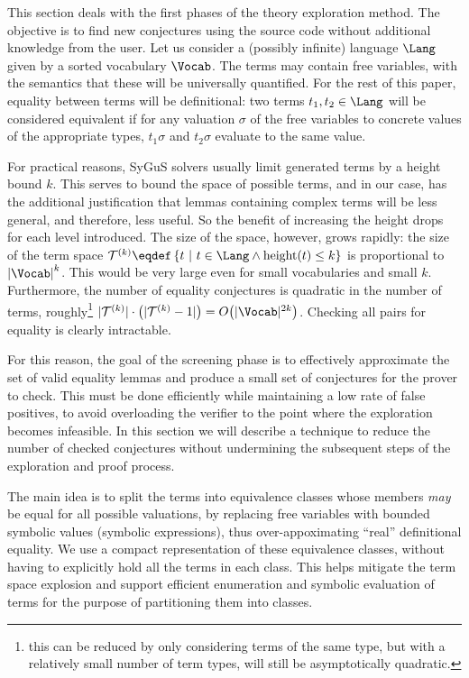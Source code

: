 This section deals with the first phases of the theory exploration method.
The objective is to find new conjectures using the source code without additional knowledge from the user.
Let us consider a (possibly infinite) language $\Lang$ given by a sorted vocabulary $\Vocab$.
The terms may contain free variables, with the semantics that these will be universally quantified.
For the rest of this paper, equality between terms will be definitional: two terms
$t_1, t_2 \in \Lang$ will be considered equivalent if for any valuation $\sigma$ of the 
free variables to concrete values of the appropriate types, $t_1\sigma$ and $t_2\sigma$
evaluate to the same value.

For practical reasons, SyGuS solvers usually limit generated terms by a height bound $k$.
This serves to bound the space of possible terms, and in our case, has the additional
justification that lemmas containing complex terms will be less general, and therefore,
less useful.
So the benefit of increasing the height drops for each level introduced.
The size of the space, however, grows rapidly: the size of the term space
$\mathcal{T}^{(k)} \eqdef \left\{t ~\vert~ t \in \Lang \land 
    \mathrm{height}(t) \le k\right\}$
is proportional to $\left|\Vocab\right|^k$.
This would be very large even for small vocabularies and small $k$.
Furthermore, the number of equality conjectures is quadratic in the number of terms,
roughly\footnote{this can be reduced by only considering terms of the same type, but with a relatively
small number of term types, will still be asymptotically quadratic.}
$|\mathcal{T}^{(k)}|\cdot\left(|\mathcal{T}^{(k)}-1|\right) = O{\left(|\Vocab|^{2k}\right)}$.
Checking all pairs for equality is clearly intractable.

For this reason, the goal of the screening phase is to effectively approximate the set of
valid equality lemmas and produce a small set of conjectures for the prover to check.
This must be done efficiently while maintaining a low rate of false positives, to avoid overloading
the verifier to the point where the exploration becomes infeasible.
In this section we will describe a technique to reduce the number of checked conjectures without undermining the subsequent steps of the exploration and proof process.

The main idea is to split the terms into equivalence classes whose members \emph{may} be equal for all
possible valuations, by replacing free variables with bounded symbolic values (symbolic expressions), thus over-appoximating
``real'' definitional equality.
We use a compact representation of these equivalence classes, without having to explicitly hold
all the terms in each class.
This helps mitigate the term space explosion and support efficient enumeration and symbolic evaluation
of terms for the purpose of partitioning them into classes.


